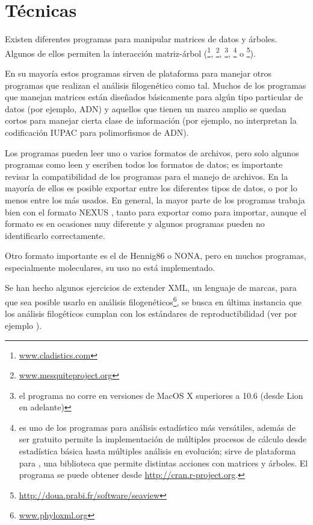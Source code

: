 \section*{T\'ecnicas}

Existen diferentes programas para manipular matrices de datos y \'arboles. Algunos de ellos permiten la interacci\'on matriz-\'arbol 
(\footnote{\url{www.cladistics.com}}, 
\footnote{\url{www.mesquiteproject.org}}, 
\footnote{el programa no corre en versiones de MacOS X superiores a 10.6 (desde Lion en adelante)}, 
\footnote{ es uno de los programas para an\'alisis estad\'istico m\'as vers\'atiles, adem\'as de ser gratuito permite la implementaci\'on de m\'ultiples procesos de c\'alculo desde estad\'istica b\'asica hasta m\'ultiples an\'alisis en evoluci\'on; sirve de plataforma para  \cite{Paradis2008}, una biblioteca que permite distintas acciones con matrices y \'arboles. El programa se puede obtener desde \url{http://cran.r-project.org}.}
o 
\footnote{\url{http://doua.prabi.fr/software/seaview}}). 

En su mayor\'ia estos programas sirven de plataforma para manejar otros programas que realizan el an\'alisis filogen\'etico como tal. Muchos de los programas que manejan matrices est\'an dise\~nados b\'asicamente para alg\'un tipo particular de datos (por ejemplo, ADN) y aquellos que tienen un marco amplio se quedan cortos para manejar cierta clase de informaci\'on (por ejemplo, no interpretan la codificaci\'on IUPAC para polimorfismos de ADN).

Los programas pueden leer uno o varios formatos de archivos, pero solo algunos programas como  leen y escriben todos los formatos de datos; es importante revisar la compatibilidad de los programas para el manejo de archivos. En la mayor\'ia de ellos es posible exportar entre los diferentes tipos de datos, o por lo menos entre los m\'as usados. En general, la mayor parte de los programas trabaja bien con el formato NEXUS \citep{Maddison1997}, tanto para exportar como para importar, aunque el formato es en ocasiones muy diferente y algunos programas pueden no identificarlo correctamente. 

Otro formato importante es el de Hennig86 o NONA, pero en muchos programas, especialmente moleculares, su uso no est\'a implementado.

Se han hecho algunos ejercicios de extender XML, un lenguaje de marcas, para que sea posible usarlo en an\'alisis filogen\'eticos\footnote{\url{www.phyloxml.org}}, se busca en \'ultima instancia que los an\'alisis filog\'eticos cumplan con los est\'andares de reproductibilidad (ver por ejemplo \cite{Cranston2014}).

